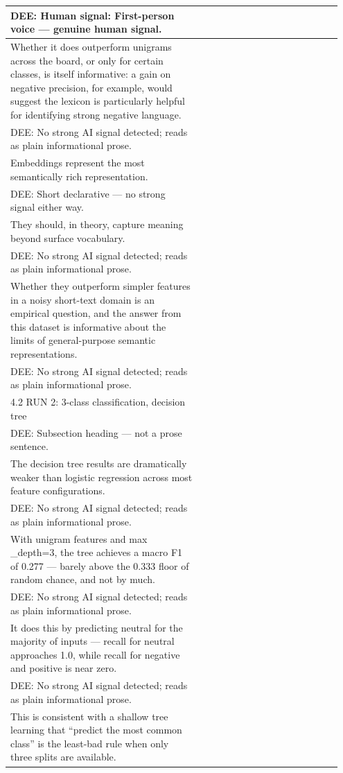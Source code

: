 \documentclass[11pt]{article}
\begin{document}
\begin{longtable}{|p{0.55\linewidth}|p{0.40\linewidth}|}
\hline
DEE: Human signal: First-person voice --- genuine human signal. & \\
\hline
Whether it does outperform unigrams across the board, or only for certain classes, is itself informative: a gain on negative precision, for example, would suggest the lexicon is particularly helpful for identifying strong negative language. & \\[2pt]
\hline
DEE: No strong AI signal detected; reads as plain informational prose. & \\
\hline
Embeddings represent the most semantically rich representation. & \\[2pt]
\hline
DEE: Short declarative --- no strong signal either way. & \\
\hline
They should, in theory, capture meaning beyond surface vocabulary. & \\[2pt]
\hline
DEE: No strong AI signal detected; reads as plain informational prose. & \\
\hline
Whether they outperform simpler features in a noisy short-text domain is an empirical question, and the answer from this dataset is informative about the limits of general-purpose semantic representations. & \\[2pt]
\hline
DEE: No strong AI signal detected; reads as plain informational prose. & \\
\hline
4.2 RUN 2: 3-class classification, decision tree & \\[2pt]
\hline
DEE: Subsection heading --- not a prose sentence. & \\
\hline
The decision tree results are dramatically weaker than logistic regression across most feature configurations. & \\[2pt]
\hline
DEE: No strong AI signal detected; reads as plain informational prose. & \\
\hline
With unigram features and max \_depth=3, the tree achieves a macro F1 of 0.277 --- barely above the 0.333 floor of random chance, and not by much. & \\[2pt]
\hline
DEE: No strong AI signal detected; reads as plain informational prose. & \\
\hline
It does this by predicting neutral for the majority of inputs --- recall for neutral approaches 1.0, while recall for negative and positive is near zero. & \\[2pt]
\hline
DEE: No strong AI signal detected; reads as plain informational prose. & \\
\hline
This is consistent with a shallow tree learning that ``predict the most common class'' is the least-bad rule when only three splits are available. & \\[2pt]

\end{longtable}
\end{document}
